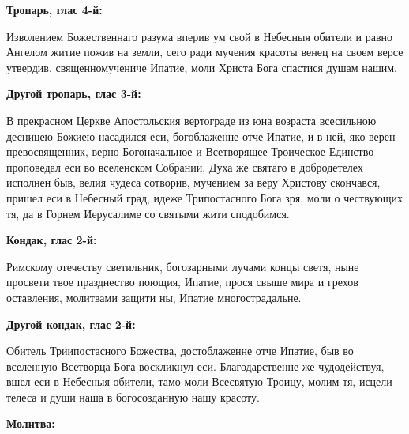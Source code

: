 \bfseries Тропарь, глас 4-й:\normalfont{}\nopagebreak


Изволением Божественнаго разума вперив ум свой в Небесныя обители и равно Ангелом житие пожив на земли, сего ради мучения красоты венец на своем версе утвердив, священномучениче Ипатие, моли Христа Бога спастися душам нашим.


\medskip


\bfseries Другой тропарь, глас 3-й:\normalfont{}\nopagebreak


В прекрасном Церкве Апостольския вертограде из юна возраста всесильною десницею Божиею насадился еси, богоблаженне отче Ипатие, и в ней, яко верен превосвященник, верно Богоначальное и Всетворящее Троическое Единство проповедал еси во вселенском Собрании, Духа же святаго в добродетелех исполнен быв, велия чудеса сотворив, мучением за веру Христову скончався, пришел еси в Небесный град, идеже Трипостасного Бога зря, моли о чествующих тя, да в Горнем Иерусалиме со святыми жити сподобимся.


\medskip


\bfseries Кондак, глас 2-й:\normalfont{}\nopagebreak


Римскому отечеству светильник, богозарными лучами концы светя, ныне просвети твое празднество поющия, Ипатие, прося свыше мира и грехов оставления, молитвами защити ны, Ипатие многострадальне.


\medskip


\bfseries Другой кондак, глас 2-й:\normalfont{}\nopagebreak


Обитель Триипостасного Божества, достоблаженне отче Ипатие, быв во вселенную Всетворца Бога воскликнул еси. Благодарственне же чудодействуя, вшел еси в Небесныя обители, тамо моли Всесвятую Троицу, молим тя, исцели телеса и души наша в богосозданную нашу красоту.


\medskip


\bfseries Молитва:\normalfont{}\nopagebreak


